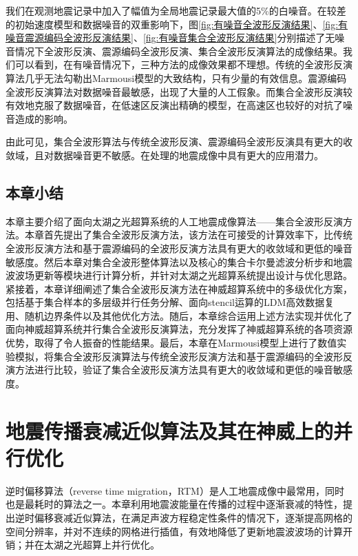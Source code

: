 \documentclass[degree=doctor]{thuthesis}
\begin{document}
我们在观测地震记录中加入了幅值为全局地震记录最大值的5\%的白噪音。在较差的初始速度模型和数据噪音的双重影响下，图\ref{fig:有噪音全波形反演结果}、\ref{fig:有噪音震源编码全波形反演结果}、\ref{fig:有噪音集合全波形反演结果}分别描述了无噪音情况下全波形反演、震源编码全波形反演、集合全波形反演算法的成像结果。我们可以看到，在有噪音情况下，三种方法的成像效果都不理想。传统的全波形反演算法几乎无法勾勒出Marmousi模型的大致结构，只有少量的有效信息。震源编码全波形反演算法对数据噪音最敏感，出现了大量的人工假象。而集合全波形反演较有效地克服了数据噪音，在低速区反演出精确的模型，在高速区也较好的对抗了噪音造成的影响。

由此可见，集合全波形算法与传统全波形反演、震源编码全波形反演具有更大的收敛域，且对数据噪音更不敏感。在处理的地震成像中具有更大的应用潜力。


\section{本章小结} %
\label{sec:本章小结}

本章主要介绍了面向太湖之光超算系统的人工地震成像算法——集合全波形反演方法。本章首先提出了集合全波形反演方法，该方法在可接受的计算效率下，比传统全波形反演方法和基于震源编码的全波形反演方法具有更大的收敛域和更低的噪音敏感度。然后本章对集合全波形整体算法以及核心的集合卡尔曼滤波分析步和地震波波场更新等模块进行计算分析，并针对太湖之光超算系统提出设计与优化思路。紧接着，本章详细阐述了集合全波形反演方法在神威超算系统中的多级优化方案，包括基于集合样本的多层级并行任务分解、面向stencil运算的LDM高效数据复用、随机边界条件以及其他优化方法。随后，本章综合运用上述方法实现并优化了面向神威超算系统并行集合全波形反演算法，充分发挥了神威超算系统的各项资源优势，取得了令人振奋的性能结果。最后，本章在Marmousi模型上进行了数值实验模拟，将集合全波形反演算法与传统全波形反演方法和基于震源编码的全波形反演方法进行比较，验证了集合全波形反演方法具有更大的收敛域和更低的噪音敏感度。


\chapter{地震传播衰减近似算法及其在神威上的并行优化}
\label{ch:地震传播衰减近似算法及其在神威上的并行优化}
逆时偏移算法（reverse time migration，RTM）是人工地震成像中最常用，同时也是最耗时的算法之一。本章利用地震波能量在传播的过程中逐渐衰减的特性，提出逆时偏移衰减近似算法，在满足声波方程稳定性条件的情况下，逐渐提高网格的空间分辨率，并对不连续的网格进行插值，有效地降低了更新地震波波场的计算开销；并在太湖之光超算上并行优化。
\end{document}
